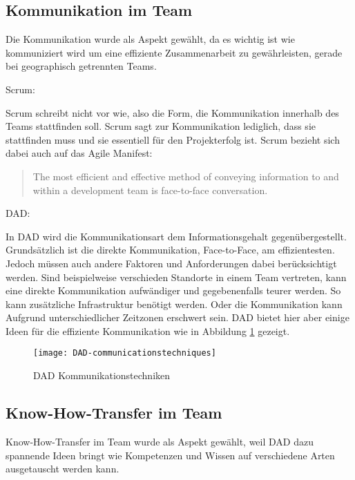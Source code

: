 \pagebreak

\subsection{Kommunikation im Team}

Die Kommunikation wurde als Aspekt gewählt, da es wichtig ist wie kommuniziert wird um eine effiziente Zusammenarbeit zu gewährleisten, gerade bei geographisch getrennten Teams.\medskip

{\Large Scrum:} \medskip

Scrum schreibt nicht vor wie, also die Form, die Kommunikation innerhalb des Teams stattfinden soll. Scrum sagt zur Kommunikation lediglich, dass sie stattfinden muss und sie essentiell für den Projekterfolg ist. Scrum bezieht sich dabei auch auf das Agile Manifest:\begin{quote}
	The most efficient and effective method of
conveying information to and within a development
team is face-to-face conversation. \cite{agileManifest}
\end{quote}
\bigskip 

{\Large DAD:} \cite{collabComDad} \medskip

In DAD wird die Kommunikationsart dem Informationsgehalt gegenübergestellt. Grundsätzlich ist die direkte Kommunikation, Face-to-Face, am effizientesten. Jedoch müssen auch andere Faktoren und Anforderungen dabei berücksichtigt werden. Sind beispielweise verschieden Standorte in einem Team vertreten, kann eine direkte Kommunikation aufwändiger und gegebenenfalls teurer werden. So kann zusätzliche Infrastruktur benötigt werden. Oder die Kommunikation kann Aufgrund unterschiedlicher Zeitzonen erschwert sein. DAD bietet hier aber einige Ideen für die effiziente Kommunikation wie in Abbildung \ref{fig:DAD-communicationstechniques} gezeigt.\medskip

\begin{figure}[H]
	\centering
	\texttt{[image: DAD-communicationstechniques]}
	\caption{DAD Kommunikationstechniken}
	\label{fig:DAD-communicationstechniques}
\end{figure}

\subsection{Know-How-Transfer im Team}

Know-How-Transfer im Team wurde als Aspekt gewählt, weil DAD dazu spannende Ideen bringt wie Kompetenzen und Wissen auf verschiedene Arten ausgetauscht werden kann. \medskip

